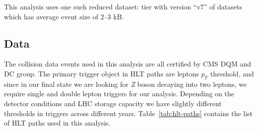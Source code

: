 This analysis uses one such reduced dataset: \NanoAOD{} tier with version ``v7'' of datasets
which has average event size of 2--3 kB.

\subsection{
  Data
}

The collision data events used in this analysis are all certified
by \gls{CMS} \gls{DQM} and \gls{DC} group. The primary trigger object in
\gls{HLT} paths are leptons \( p_{T} \) threshold, and since in our final state
we are looking for \textit{Z} boson decaying into two leptons, we require single and
double lepton triggers for our analysis. Depending on the detector
conditions and \gls{LHC} storage capacity we have slightly different thresholds
in triggers across different years. Table~\ref{tab:hlt-paths} contains the list of
\gls{HLT} paths used in this analysis.

